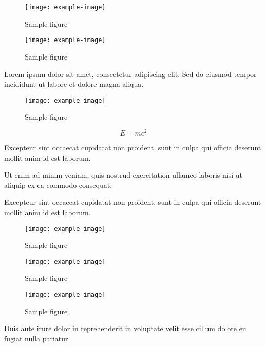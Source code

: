 \documentclass{article}
\begin{document}
\begin{figure}[h]
    \centering
    \texttt{[image: example-image]}
    \caption{Sample figure}
    \label{fig:sample}
\end{figure}

\begin{figure}[h]
    \centering
    \texttt{[image: example-image]}
    \caption{Sample figure}
    \label{fig:sample}
\end{figure}


Lorem ipsum dolor sit amet, consectetur adipiscing elit. Sed do eiusmod tempor incididunt ut labore et dolore magna aliqua.

\begin{figure}[h]
    \centering
    \texttt{[image: example-image]}
    \caption{Sample figure}
    \label{fig:sample}
\end{figure}

\begin{equation}
    E = mc^2
\end{equation}

Excepteur sint occaecat cupidatat non proident, sunt in culpa qui officia deserunt mollit anim id est laborum.

Ut enim ad minim veniam, quis nostrud exercitation ullamco laboris nisi ut aliquip ex ea commodo consequat.

Excepteur sint occaecat cupidatat non proident, sunt in culpa qui officia deserunt mollit anim id est laborum.

\begin{figure}[h]
    \centering
    \texttt{[image: example-image]}
    \caption{Sample figure}
    \label{fig:sample}
\end{figure}


\begin{figure}[h]
    \centering
    \texttt{[image: example-image]}
    \caption{Sample figure}
    \label{fig:sample}
\end{figure}

\begin{figure}[h]
    \centering
    \texttt{[image: example-image]}
    \caption{Sample figure}
    \label{fig:sample}
\end{figure}

Duis aute irure dolor in reprehenderit in voluptate velit esse cillum dolore eu fugiat nulla pariatur.
\end{document}
